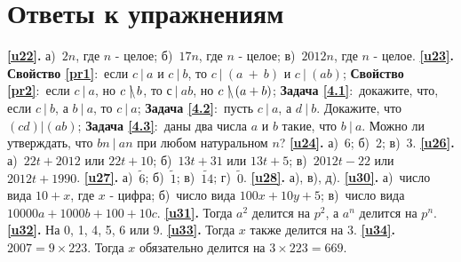 \section{Ответы к упражнениям}
\textbf{\ref{u22}.} а)~$2n$, где $n$ - целое; б)~$17n$, где $n$ - целое; в)~$2012n$, где $n$ - целое. 
\textbf{\ref{u23}.} \textbf{Свойство \ref{pr1}}:~если $c~|~a$  и $c~|~b$, то $c~|~(a~+~b)$ и $c~|~(ab)$; \textbf{Свойство \ref{pr2}}:~если $c~|~a$, но $c~\mathrlap{\backslash}|~b$, то $с~|~ab$, но $c~\mathrlap{\backslash}|~(a+b)$; \textbf{Задача \ref{4.1}}:~докажите, что, если $c~|~b$, а $b~|~a$, то $c~|~a$; \textbf{Задача \ref{4.2}}:~пусть $c~|~a$, а $d~|~b$. Докажите, что $(cd)|(ab)$; \textbf{Задача \ref{4.3}}:~даны два числа $a$ и $b$ такие, что $b~|~a$. Можно ли утверждать, что $bn~|~an$ при любом натуральном $n$? 
\textbf{\ref{u24}.} а)~6; б)~2; в)~3.
\textbf{\ref{u26}.} а)~$22t+2012$ или $22t+10$; б)~$13t+31$ или $13t+5$; в)~$2012t-22$ или $2012t+1990$.
\textbf{\ref{u27}.} а)~$\tilde{6}$; б)~$\tilde{1}$; в)~$\tilde{14}$; г)~$\tilde{0}$.
\textbf{\ref{u28}.} а), в), д).
\textbf{\ref{u30}.} а)~число вида $10+x$, где $x$ - цифра; б)~число вида $100x+10y+5$; в)~число вида $10000a + 1000b + 100 + 10c$.
\textbf{\ref{u31}.} Тогда $a^2$ делится на $p^2$, а $a^n$ делится на $p^n$. 
\textbf{\ref{u32}.} На 0, 1, 4, 5, 6 или 9. 
\textbf{\ref{u33}.} Тогда $x$ также делится на 3.
\textbf{\ref{u34}.} $2007 = 9 \times 223$. Тогда $x$ обязательно делится на $3 \times 223 = 669$.